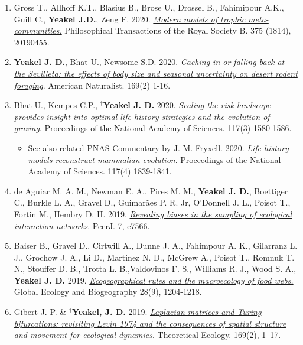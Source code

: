 \documentclass[margin,line,12pt]{res}
\begin{document}
\begin{resume}
\begin{enumerate}
\item Gross T., Allhoff K.T., Blasius B., Brose U., Drossel B., Fahimipour A.K., Guill C., \textbf{Yeakel J.D.}, Zeng F. 2020. \href{https://royalsocietypublishing.org/doi/pdf/10.1098/rstb.2019.0455}{\emph{Modern models of trophic meta-communities.}} Philosophical Transactions of the Royal Society B. 375 (1814), 20190455.

\item \textbf{Yeakel J. D.}, Bhat U., Newsome S.D. 2020. \href{https://www.journals.uchicago.edu/doi/10.1086/709019}{\emph{Caching in or falling back at the Sevilleta: the effects of body size and seasonal uncertainty on desert rodent foraging}}. American Naturalist. 169(2) 1-16.

\item Bhat U., Kempes C.P., \textbf{${}^\dag$Yeakel J. D.} 2020. \href{https://doi.org/10.1073/pnas.1907998117}{\emph{Scaling the risk landscape provides insight into optimal life history strategies and the evolution of grazing}}. Proceedings of the National Academy of Sciences.  117(3) 1580-1586.
  {\footnotesize
	\begin{itemize}
		\item See also related PNAS Commentary by J. M. Fryxell. 2020. \href{https://www.pnas.org/content/117/4/1839}{\emph{Life-history models reconstruct mammalian evolution}}. Proceedings of the National Academy of Sciences. 117(4) 1839-1841.
	\end{itemize}
  }
\item de Aguiar M. A. M., Newman E. A., Pires M. M., \textbf{Yeakel J. D.}, Boettiger C., Burkle L. A., Gravel D., Guimar\~aes P. R. Jr, O’Donnell J. L., Poisot T., Fortin M., Hembry D. H. 2019. \href{https://peerj.com/articles/7566/}{\emph{Revealing biases in the sampling of ecological interaction networks}}. PeerJ. 7, e7566.

\item Baiser B., Gravel D., Cirtwill A., Dunne J. A., Fahimpour A. K., Gilarranz L. J., Grochow J. A., Li D., Martinez N. D., McGrew A., Poisot T., Romnuk T. N., Stouffer D. B., Trotta L. B.,Valdovinos F. S., Williams R. J., Wood S. A., \textbf{Yeakel J. D.} 2019. \href{https://onlinelibrary.wiley.com/doi/abs/10.1111/geb.12925}{\emph{Ecogeographical rules and the macroecology of food webs.}} Global Ecology and Biogeography 28(9), 1204-1218.

\item Gibert J. P. \& \textbf{${}^\dag$Yeakel, J. D.} 2019. \href{https://link.springer.com/article/10.1007/s12080-018-0403-2}{\emph{Laplacian matrices and Turing bifurcations: revisiting Levin 1974 and the consequences of spatial structure and movement for ecological dynamics}}. Theoretical Ecology. 169(2), 1–17.


\end{enumerate}
\end{resume}
\end{document}
